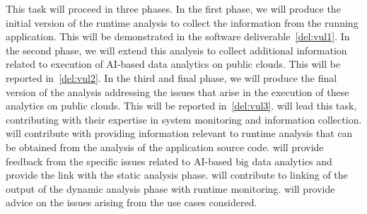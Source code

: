 \begin{Workpackage}{\thewpno}
\begin{Task}
This task will proceed in three phases. In the first phase, we will produce the initial version of the runtime analysis to collect the information from the running application. This will be demonstrated in the software deliverable~\ref{del:vul1}. In the second phase, we will extend this analysis to collect additional information related to execution of AI-based data analytics on public clouds. This will be reported in~\ref{del:vul2}. In the third and final phase, we will produce the final version of the analysis addressing the issues that arise in the execution of these analytics on public clouds. This will be reported in~\ref{del:vul3}. \SCCHshort{} will lead this task, contributing with their expertise in system monitoring and information collection. \YAGshort{} will contribute with providing information relevant to runtime analysis that can be obtained from the analysis of the application source code. \UODshort{} will provide feedback from the specific issues related to AI-based big data analytics and provide the link with the static analysis phase. \IBMshort{} will contribute to linking of the output of the dynamic analysis phase with runtime monitoring. \SOPRAshort{} will provide advice on the issues arising from the use cases considered. 
\end{Task}

\begin{Task}
\TaskResults{%
\ref{del:vul1},
\ref{del:vul2},
\ref{del:vul3}
}
\TaskHeader{}


\end{Task}
\end{Workpackage}
